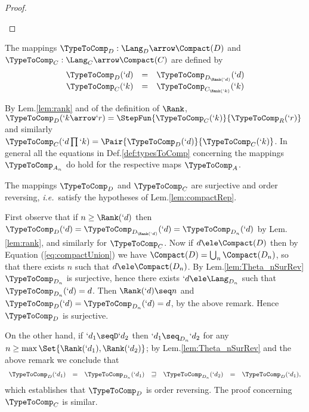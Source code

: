 \documentclass{lmcs}
\def\ie{\emph{i.e.}}
\begin{document}
\begin{proof}
\begin{description}
 \end{description}
 \end{proof}


 \begin{defi} \label{def:typeInterpDandC}
The mappings $\TypeToComp_D:\Lang_D\arrow \Compact(D)$ and $\TypeToComp_C:\Lang_C\arrow \Compact(C)$ are defined by
%
 \[ \begin{array}{rcl}
\TypeToComp_D(`d) &=& \TypeToComp_{D_{\Rank(`d)}}(`d) \\
\TypeToComp_C(`k) &=& \TypeToComp_{C_{\Rank(`k)}}(`k)
 \end{array} \]
 \end{defi}

 \begin{rem} \label{rem:ThetaRank}
By Lem.\skp\ref{lem:rank} and of the definition of $\Rank$, $\TypeToComp_D(`k\arrow `r) = \StepFun{\TypeToComp_C(`k)}{\TypeToComp_R(`r)}$ and similarly $\TypeToComp_C(`d\prod`k) = \Pair{\TypeToComp_D(`d)}{\TypeToComp_C(`k)}$. In general all the equations
in Def.\skp\ref{def:typesToComp} concerning the mappings $\TypeToComp_{A_n}$ do hold for the respective maps
$\TypeToComp_{A}$.
 \end{rem}

 \begin{lem} \label{lem:Theta_AsurjOderRev}
The mappings $\TypeToComp_D$ and $\TypeToComp_C$ are surjective and order reversing, \ie~satisfy the hypotheses of Lem.\skp\ref{lem:compactRep}.
 \end{lem}

 \begin{Proof}
First observe that if $n \geq \Rank(`d)$ then $\TypeToComp_D(`d) = \TypeToComp_{D_{\Rank(`d)}}(`d) = \TypeToComp_{D_n}(`d)$ 
by Lem.\skp\ref{lem:rank}, and similarly for $\TypeToComp_C$.
Now if $d\ele \Compact(D)$ then by Equation (\ref{eq:compactUnion}) we have $\Compact(D) = \bigcup_n \Compact(D_n)$, so that there exists $n$ such that $d \ele \Compact(D_n)$. By Lem.\skp\ref{lem:Theta_nSurRev} $\TypeToComp_{D_n}$ is surjective, hence there exists $`d \ele \Lang_{D_n}$ such that $\TypeToComp_{D_n}(`d) = d$. Then $\Rank(`d) \seq n$ and
$\TypeToComp_D(`d) = \TypeToComp_{D_n}(`d)= d$, by the above remark. Hence $\TypeToComp_D$ is surjective.

On the other hand, if $`d_1 \seqD `d_2$ then $`d_1 \seq_{D_n} `d_2$ for any $n \geq \max\Set{\Rank(`d_1),\Rank(`d_2)}$; by 
Lem.\skp\ref{lem:Theta_nSurRev} and the above remark we conclude that
%
 \[ \begin{array}{rcl@{\quad}lccc}
\TypeToComp_D(`d_1) &=& \TypeToComp_{D_n}(`d_1) &\sqsupseteq& \TypeToComp_{D_n}(`d_2) &=& \TypeToComp_D(`d_1),
 \end{array} \]
which establishes that $\TypeToComp_D$ is order reversing. 
The proof concerning $\TypeToComp_C$ is similar. ~%
 \end{Proof}
\end{document}
